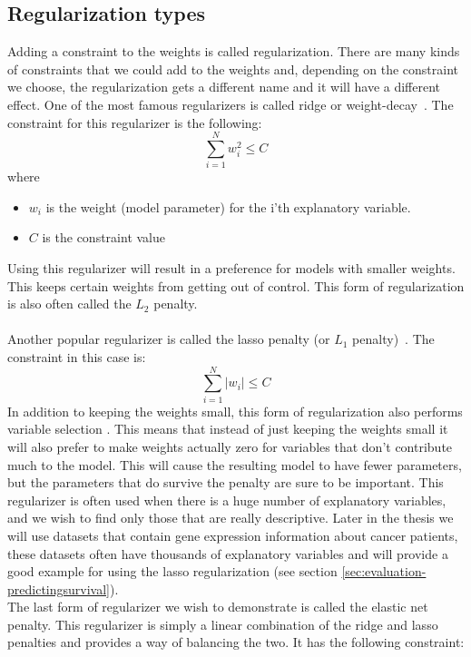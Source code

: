 \subsection{Regularization types}
\label{subsec:glm-regularization-types}
Adding a constraint to the weights is called regularization. There are many kinds of constraints that we could add to the weights and, depending on the constraint we choose, the regularization gets a different name and it will have a different effect. One of the most famous regularizers is called ridge or weight-decay~\cite{friedman2010regularization}. The constraint for this regularizer is the following:
$$
\sum_{i=1}^{N}w_{i}^{2} \leq C
$$
where
\begin{itemize}
	\item $w_{i}$ is the weight (model parameter) for the i'th explanatory variable.
	\item $C$ is the constraint value
\end{itemize}
Using this regularizer will result in a preference for models with smaller weights. This keeps certain weights from getting out of control. This form of regularization is also often called the $L_{2}$ penalty. \\ \\
\label{insec:glm-lasso}
Another popular regularizer is called the lasso penalty (or $L_{1}$ penalty)~\cite{friedman2010regularization}. The constraint in this case is:
$$
\sum_{i=1}^{N}\lvert w_{i}\rvert \leq C
$$
In addition to keeping the weights small, this form of regularization also performs variable selection \cite{tibshirani1997lasso}. This means that instead of just keeping the weights small it will also prefer to make weights actually zero for variables that don't contribute much to the model. This will cause the resulting model to have fewer parameters, but the parameters that do survive the penalty are sure to be important. This regularizer is often used when there is a huge number of explanatory variables, and we wish to find only those that are really descriptive. Later in the thesis we will use datasets that contain gene expression information about cancer patients, these datasets often have thousands of explanatory variables and will provide a good example for using the lasso regularization (see section \ref{sec:evaluation-predictingsurvival}). \\
The last form of regularizer we wish to demonstrate is called the elastic net penalty. This regularizer is simply a linear combination of the ridge and lasso penalties and provides a way of balancing the two. It has the following constraint:

